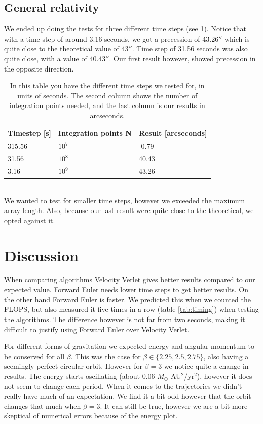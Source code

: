 \documentclass[reprint, english,notitlepage,nofootinbib]{revtex4-1}  %
\begin{document}
\subsection{General relativity}

We ended up doing the tests for three different time steps (see \ref{tab:general_relativity}). Notice that with a time step of around 3.16 seconds, we got a precession of 43.26$''$ which is quite close to the theoretical value of 43$''$. Time step of 31.56 seconds was also quite close, with a value of 40.43$''$. Our first result however, showed precession in the opposite direction.
\begin{table}[h]
	\begin{tabular}{|l|l|l|}
		\hline
		Timestep {[}s{]} & Integration points N & Result {[}arcseconds{]} \\
		\hline
		315.56              & $10^7$          & -0.79               \\
		31.56               & $10^8$          & 40.43                 \\
		3.16                & $10^9$          & 43.26	\\
		\hline
	\end{tabular}
	\caption{In this table you have the different time steps we tested for, in units of seconds. The second column shows the number of integration points needed, and the last column is our results in arcseconds.
	\label{tab:general_relativity}}
\end{table}
\\
We wanted to test for smaller time steps, however we exceeded the maximum array-length. Also, because our last result were quite close to the theoretical, we opted against it.

\clearpage
\clearpage
\clearpage
\clearpage
\section{Discussion}

When comparing algorithms Velocity Verlet gives better results compared to our expected value. Forward Euler needs lower time steps to get better results. On the other hand Forward Euler is faster. We predicted this when we counted the FLOPS, but also measured it five times in a row (table \ref{tab:timing}) when testing the algorithms. The difference however is not far from two seconds, making it difficult to justify using Forward Euler over Velocity Verlet.

For different forms of gravitation we expected energy and angular momentum to be conserved for all $\beta$. This was the case for $\beta \in \{2.25,2.5,2.75\}$, also having a seemingly perfect circular orbit. However for $\beta = 3$ we notice quite a change in results. The energy starts oscillating (about 0.06 $M_\odot$ AU$^2$/yr$^2$), however it does not seem to change each period. When it comes to the trajectories we didn't really have much of an expectation. We find it a bit odd however that the orbit changes that much when $\beta = 3$. It can still be true, however we are a bit more skeptical of numerical errors because of the energy plot.
\end{document}
